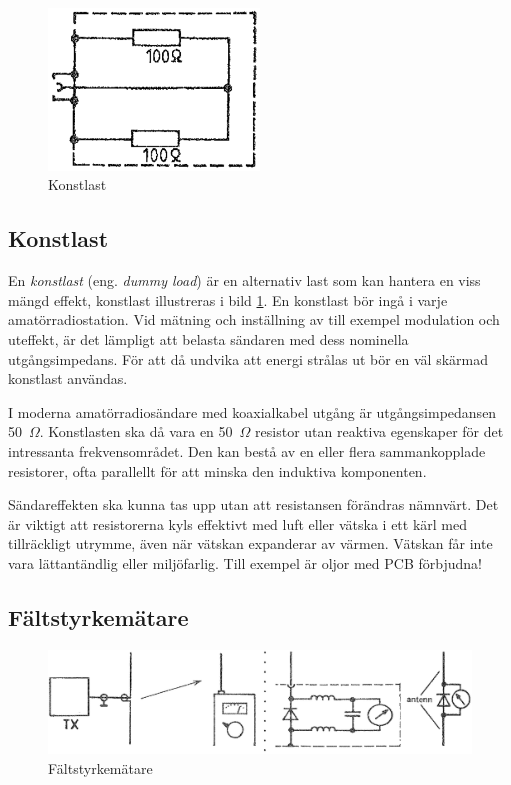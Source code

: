 \begin{figure}
  \includegraphics[width=0.5\textwidth]{images/cropped_pdfs/bild_2_8-05.pdf}
  \caption{Konstlast}
  \label{fig:bildII8-5}
\end{figure}

\subsection{Konstlast}

En \emph{konstlast} (eng. \emph{dummy load}) är en alternativ last som kan
hantera en viss mängd effekt, konstlast illustreras i bild \ref{fig:bildII8-5}.
En konstlast bör ingå i varje amatörradiostation.
Vid mätning och inställning av till exempel modulation och uteffekt, är det
lämpligt att belasta sändaren med dess nominella utgångsimpedans.
För att då undvika att energi strålas ut bör en väl skärmad konstlast användas.

I moderna amatörradiosändare med koaxialkabel utgång är utgångsimpedansen
50~\(\Omega\).
Konstlasten ska då vara en 50~\(\Omega\) resistor utan reaktiva egenskaper
för det intressanta frekvensområdet.
Den kan bestå av en eller flera sammankopplade resistorer, ofta parallellt för
att minska den induktiva komponenten.

Sändareffekten ska kunna tas upp utan att resistansen förändras nämnvärt.
Det är viktigt att resistorerna kyls effektivt med luft eller vätska i ett kärl
med tillräckligt utrymme, även när vätskan expanderar av värmen.
Vätskan får inte vara lättantändlig eller miljöfarlig.
Till exempel är oljor med PCB förbjudna!

\subsection{Fältstyrkemätare}

\begin{figure}
  \includegraphics[width=\textwidth]{images/cropped_pdfs/bild_2_8-06.pdf}
  \caption{Fältstyrkemätare}
  \label{fig:bildII8-6}
\end{figure}

